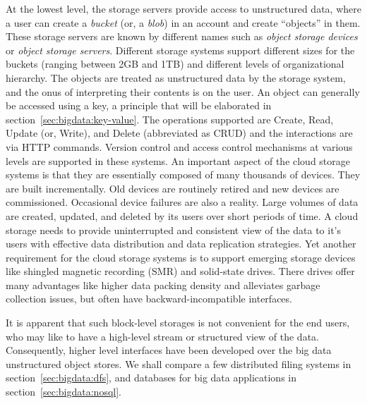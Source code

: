 At the lowest level, the storage servers provide access to unstructured data, where a user can create a {\em bucket} (or, 
a {\em blob}) in an account and create ``objects'' in them. These storage servers are known by different names such as 
{\em object storage devices} or {\em object storage servers}. Different storage systems support different sizes for the buckets 
(ranging between 2GB and 1TB) and different levels of organizational hierarchy. The objects are treated as unstructured data 
by the storage system, and the onus of interpreting their contents is on the user. An object can generally be accessed using
a key, a principle that will be elaborated in section~\ref{sec:bigdata:key-value}. The operations supported are Create, Read, 
Update (or, Write), and Delete (abbreviated as CRUD) and the interactions are via HTTP commands. Version control and access 
control mechanisms at various levels are supported in these systems. An important aspect of the cloud storage systems is that 
they are essentially composed of many thousands of devices. They are built incrementally. Old devices are routinely retired and 
new devices are commissioned. Occasional device failures are also a reality. Large volumes of data are created, updated, and 
deleted by its users over short periods of time. A cloud storage needs to provide uninterrupted and consistent view of the data 
to it's users with effective data distribution and data replication strategies. Yet another requirement for the cloud storage
systems is to support emerging storage devices like shingled magnetic recording (SMR) and solid-state drives. There drives
offer many advantages like higher data packing density and alleviates garbage collection issues, but often have backward-incompatible 
interfaces.

It is apparent that such block-level storages is not convenient for the end users, who may like to have a high-level stream
or structured view of the data. Consequently, higher level interfaces have been developed over the big data unstructured object 
stores. We shall compare a few distributed filing systems in section~\ref{sec:bigdata:dfs}, and databases for big data applications
in section~\ref{sec:bigdata:nosql}.

